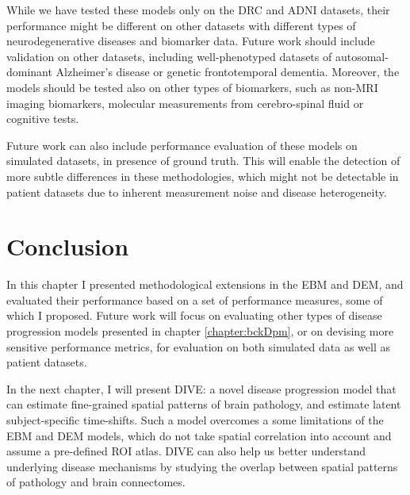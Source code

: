 While we have tested these models only on the DRC and ADNI datasets, their performance might be different on other datasets with different types of neurodegenerative diseases and biomarker data. Future work should include validation on other datasets, including well-phenotyped datasets of autosomal-dominant Alzheimer's disease or genetic frontotemporal dementia. Moreover, the models should be tested also on other types of biomarkers, such as non-MRI imaging biomarkers, molecular measurements from cerebro-spinal fluid or cognitive tests.

Future work can also include performance evaluation of these models on simulated datasets, in presence of ground truth. This will enable the detection of more subtle differences in these methodologies, which might not be detectable in patient datasets due to inherent measurement noise and disease heterogeneity.

\section{Conclusion}
\label{sec:perfCon}

In this chapter I presented methodological extensions in the EBM and DEM, and evaluated their performance based on a set of performance measures, some of which I proposed. Future work will focus on evaluating other types of disease progression models presented in chapter \ref{chapter:bckDpm}, or on devising more sensitive performance metrics, for evaluation on both simulated data as well as patient datasets.

In the next chapter, I will present DIVE: a novel disease progression model that can estimate fine-grained spatial patterns of brain pathology, and estimate latent subject-specific time-shifts. Such a model overcomes a some limitations of the EBM and DEM models, which do not take spatial correlation into account and assume a pre-defined ROI atlas. DIVE can also help us better understand underlying disease mechanisms by studying the overlap between spatial patterns of pathology and brain connectomes.

